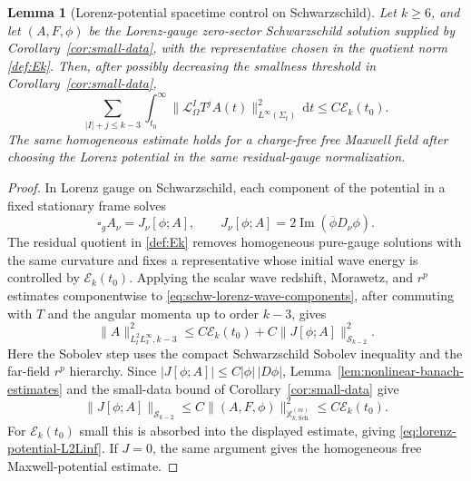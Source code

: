 \documentclass[11pt]{article}
\numberwithin{equation}{section}
\theoremstyle{plain}
\newtheorem{lemma}[theorem]{Lemma}
\theoremstyle{definition}
\theoremstyle{remark}
\newcommand{\dd}{\mathrm{d}}
\begin{document}
\begin{lemma}[Lorenz-potential spacetime control on Schwarzschild]\label{lem:schwarzschild-lorenz-potential-control}
Let \(k\ge6\), and let \((A,F,\phi)\) be the Lorenz-gauge zero-sector Schwarzschild solution supplied by Corollary~\ref{cor:small-data}, with the representative chosen in the quotient norm \eqref{def:Ek}.  Then, after possibly decreasing the smallness threshold in Corollary~\ref{cor:small-data},
\begin{equation}\label{eq:lorenz-potential-L2Linf}
\sum_{|I|+j\le k-3}\int_{t_0}^{\infty}
\|\mathcal L_\Omega^I T^j A(t)\|_{L^\infty(\Sigma_t)}^2\,\dd t
\le C\mathcal E_k(t_0).
\end{equation}
The same homogeneous estimate holds for a charge-free free Maxwell field after choosing the Lorenz potential in the same residual-gauge normalization.
\end{lemma}

\begin{proof}
In Lorenz gauge on Schwarzschild, each component of the potential in a fixed stationary frame solves
\begin{equation}\label{eq:schw-lorenz-wave-components}
 \square_g A_\nu=J_\nu[\phi;A],
 \qquad
 J_\nu[\phi;A]=2\operatorname{Im}(\overline\phi D_\nu\phi).
\end{equation}
The residual quotient in \eqref{def:Ek} removes homogeneous pure-gauge solutions with the same curvature and fixes a representative whose initial wave energy is controlled by \(\mathcal E_k(t_0)\).  Applying the scalar wave redshift, Morawetz, and \(r^p\) estimates componentwise to \eqref{eq:schw-lorenz-wave-components}, after commuting with \(T\) and the angular momenta up to order \(k-3\), gives
\begin{equation}
 \|A\|_{L^2_tL^\infty_x,k-3}^2
 \le C\mathcal E_k(t_0)+C\|J[\phi;A]\|_{\mathcal S_{k-2}}^2.
\end{equation}
Here the Sobolev step uses the compact Schwarzschild Sobolev inequality and the far-field \(r^p\) hierarchy.  Since \(|J[\phi;A]|\le C|\phi|\,|D\phi|\), Lemma~\ref{lem:nonlinear-banach-estimates} and the small-data bound of Corollary~\ref{cor:small-data} give
\begin{equation}
 \|J[\phi;A]\|_{\mathcal S_{k-2}}
 \le C\|(A,F,\phi)\|_{\mathbb X^{(m)}_{k,\mathrm{Sch}}}^{2}
 \le C\mathcal E_k(t_0).
\end{equation}
For \(\mathcal E_k(t_0)\) small this is absorbed into the displayed estimate, giving \eqref{eq:lorenz-potential-L2Linf}.  If \(J=0\), the same argument gives the homogeneous free Maxwell-potential estimate.
\end{proof}
\end{document}
